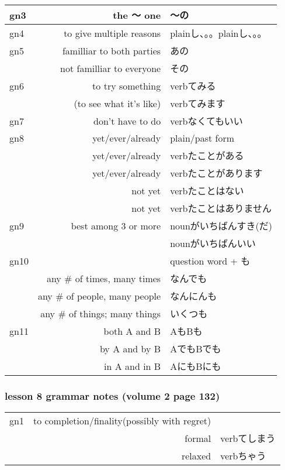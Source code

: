 \documentclass[14pt,onecolumn]{extarticle}
\begin{document}
\begin{CJK}{UTF8}{min}
\begin{tabular}{lrl}
gn3&the 〜 one&〜の\\
\hline

gn4&to give multiple reasons&plainし、。。plainし、。。\\
\hline

gn5&familliar to both parties&あの\\
&not familliar to everyone&その\\
\hline

gn6&to try something&
  verbてみる\\
&(to see what it's like)&
  verbてみます\\
\hline

gn7&don't have to do&verbなくてもいい\\
\hline

gn8&yet/ever/already&plain/past form\\
&yet/ever/already&verbたことがある\\
&yet/ever/already&verbたことがあります\\
&not yet&verbたことはない\\
&not yet&verbたことはありません\\
\hline

gn9&best among 3 or more&
  nounがいちばんすき(だ)\\
&&nounがいちばんいい\\
\hline

gn10&&question word + も\\
&any \# of times, many times&なんでも\\
&any \# of people, many people&なんにんも\\
&any \# of things; many things&いくつも\\
\hline

gn11&both A and B&AもBも\\
&by A and by B&AでもBでも\\
&in A and in B&AにもBにも\\

\end{tabular}

\subsubsection{lesson 8 grammar notes (volume 2 page 132)}

\begin{tabular}{lrl}

gn1&to completion/finality(possibly with regret)&\\
&formal&verbてしまう\\
&relaxed&verbちゃう\\
\hline


\end{tabular}
\end{CJK}
\end{document}

